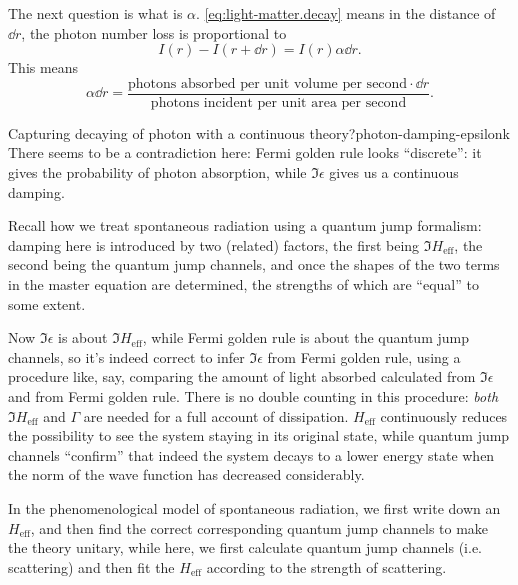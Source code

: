 \documentclass[hyperref, a4paper]{report}
\begin{document}
The next question is what is $\alpha$. 
\eqref{eq:light-matter.decay} means in the distance of $\dd{r}$, 
the photon number loss is proportional to
\[
    I(r) - I(r + \dd{r}) = I(r) \alpha \dd{r}.
\] 
This means 
\begin{equation}
    \alpha \dd{r} = \frac{
        \text{photons absorbed per unit volume per second} \cdot \dd{r}
    }{
        \text{photons incident per unit area per second}
    }.
\end{equation}

\begin{theorybox}{Capturing decaying of photon with a continuous theory?}{photon-damping-epsilonk}
    There seems to be a contradiction here:
    Fermi golden rule looks ``discrete'': 
    it gives the probability of photon absorption,
    while $\Im \epsilon$ gives us a continuous damping.
    
    Recall how we treat spontaneous radiation using a quantum jump formalism:
    damping here is introduced by two (related) factors,
    the first being $\Im H_{\text{eff}}$, the second being the quantum jump channels,
    and once the shapes of the two terms in the master equation are determined,
    the strengths of which are ``equal'' to some extent.
    
    Now $\Im \epsilon$ is about $\Im H_{\text{eff}}$,
    while Fermi golden rule is about the quantum jump channels,
    so it's indeed correct to infer $\Im \epsilon$ from Fermi golden rule,
    using a procedure like, say, 
    comparing the amount of light absorbed calculated from $\Im \epsilon$ 
    and from Fermi golden rule.
    There is no double counting in this procedure:
    \emph{both} $\Im H_{\text{eff}}$ and $\Gamma$ are needed for a full account of dissipation.
    $H_{\text{eff}}$ continuously reduces the possibility 
    to see the system staying in its original state,
    while quantum jump channels ``confirm'' that 
    indeed the system decays to a lower energy state
    when the norm of the wave function has decreased considerably.
    
    In the phenomenological model of spontaneous radiation,
    we first write down an $H_{\text{eff}}$,
    and then find the correct corresponding quantum jump channels
    to make the theory unitary,
    while here, 
    we first calculate quantum jump channels (i.e. scattering)
    and then fit the $H_{\text{eff}}$ according to the strength of scattering.
\end{theorybox}
\end{document}
